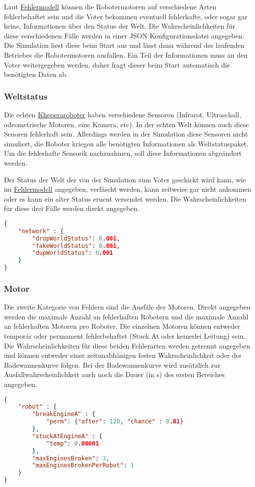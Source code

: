 Laut \hyperref[fm]{Fehlermodell} k{\"{o}}nnen die Robotermotoren auf verschiedene Arten fehlerbehaftet
sein und die Voter bekommen eventuell fehlerhafte, oder sogar gar keine, Informationen {\"{u}}ber
den Status der Welt. Die Wahrscheinlichkeiten f{\"{u}}r diese verschiedenen F{\"{a}}lle
werden in einer JSON Konfigurationsdatei angegeben. Die Simulation liest diese beim Start aus und 
l{\"{a}}sst dann w{\"{a}}hrend des laufenden Betriebes die Robotermotoren ausfallen.
Ein Teil der Informationen muss an den Voter weitergegeben werden, daher fragt dieser beim Start
automatisch die ben{\"{o}}tigten Daten ab.


\subsubsection{Weltstatus}
Die echten \hyperref[khepera]{Kheperaroboter} haben verschiedene Sensoren (Infrarot, Ultraschall,
odeometrische Motoren, eine Kamera, etc). In der echten Welt k{\"{o}}nnen auch diese Senoren fehlerhaft
sein. Allerdings werden in der Simulation diese Sensoren nicht simuliert, die Roboter kriegen alle
ben{\"{o}}tigten Informationen als Weltstatuspaket. Um die fehlerhafte Sensorik nachzuahmen, soll diese
Informationen abge{\"{a}}ndert werden.

Der Status der Welt der von der Simulation zum Voter geschickt wird kann, wie im \hyperref[fm]{Fehlermodell} angegeben, verf{\"{a}}scht werden, kann zeitweise gar
nicht ankommen oder es kann ein alter Status erneut versendet werden. Die Wahrscheinlichkeiten f{\"{u}}r diese drei F{\"{a}}lle werden direkt angegeben.
\begin{lstlisting}[frame=single, language=json] 
{
	"network" : {
		"dropWorldStatus": 0.001,
		"fakeWorldStatus": 0.001,
		"dupWorldStatus": 0.001
	}
}
\end{lstlisting}

\subsubsection{Motor}
Die zweite Kategorie von Fehlern sind die Ausf{\"{a}}le der Motoren. Direkt angegeben werden die maximale Anzahl an fehlerhaften Robotern und die maximale
Anzahl an fehlerhaften Motoren pro Roboter. Die einzelnen Motoren k{\"{o}}nnen entweder tempor{\"{a}}r oder permament fehlerbehaftet (Stuck At oder keinerlei Leitung) sein.
Die Wahrscheinlichkeiten f{\"{u}}r diese beiden Fehlerarten werden getrennt angegeben und k{\"{o}}nnen entweder einer zeitunabh{\"{a}}nigen festen Wahrscheinlichkeit oder
der Badewannenkurve folgen. Bei der Badewannenkurve wird zus{\"{a}}tzlich zur Ausfallwahrscheinlichkeit auch noch die Dauer (in s) des ersten Bereiches angegeben.
\begin{lstlisting}[frame=single, language=json] 
{
	"robot" : {
		"breakEngineA" : {
			"perm": {"after": 120, "chance" : 0.01}
		},
		"stuckAtEngineA" : {
			"temp": 0.00001
		},
		"maxEnginesBroken": 3,
		"maxEnginesBrokenPerRobot": 1
	}
}
\end{lstlisting}

